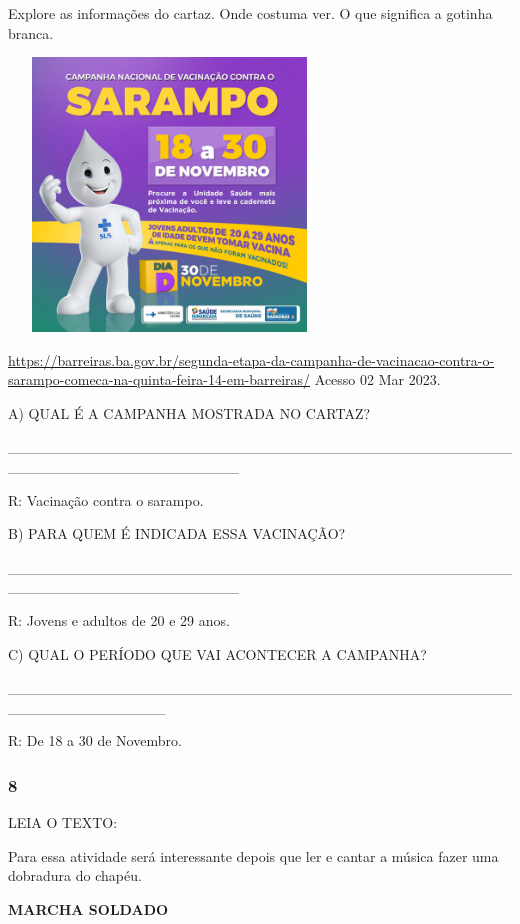 Explore as informações do cartaz. Onde costuma ver. O que significa a
gotinha branca.

\includegraphics[width=3.36943in,height=2.86363in]{media/image85.jpeg}

\url{https://barreiras.ba.gov.br/segunda-etapa-da-campanha-de-vacinacao-contra-o-sarampo-comeca-na-quinta-feira-14-em-barreiras/}
Acesso 02 Mar 2023.

A) QUAL É A CAMPANHA MOSTRADA NO CARTAZ?

\_\_\_\_\_\_\_\_\_\_\_\_\_\_\_\_\_\_\_\_\_\_\_\_\_\_\_\_\_\_\_\_\_\_\_\_\_\_\_\_\_\_\_\_\_\_\_\_\_\_\_\_\_\_\_\_\_\_\_\_\_\_\_\_\_\_\_\_\_\_

R: Vacinação contra o sarampo.

B) PARA QUEM É INDICADA ESSA VACINAÇÃO?

\_\_\_\_\_\_\_\_\_\_\_\_\_\_\_\_\_\_\_\_\_\_\_\_\_\_\_\_\_\_\_\_\_\_\_\_\_\_\_\_\_\_\_\_\_\_\_\_\_\_\_\_\_\_\_\_\_\_\_\_\_\_\_\_\_\_\_\_\_\_

R: Jovens e adultos de 20 e 29 anos.

C) QUAL O PERÍODO QUE VAI ACONTECER A CAMPANHA?

\_\_\_\_\_\_\_\_\_\_\_\_\_\_\_\_\_\_\_\_\_\_\_\_\_\_\_\_\_\_\_\_\_\_\_\_\_\_\_\_\_\_\_\_\_\_\_\_\_\_\_\_\_\_\_\_\_\_\_\_\_\_\_

R: De 18 a 30 de Novembro.

\subsubsection{8 }\label{section-36}

LEIA O TEXTO:

Para essa atividade será interessante depois que ler e cantar a música
fazer uma dobradura do chapéu.

\textbf{MARCHA SOLDADO}

